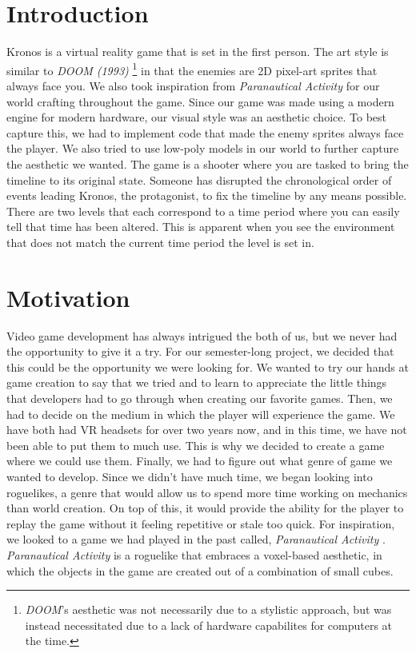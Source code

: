 \documentclass{sigchi}
\begin{document}
\section{Introduction}
Kronos is a virtual reality game that is set in the first person. The art style is similar to \textit{DOOM (1993)} \footnote[1]{\textit{DOOM}'s aesthetic was not necessarily due to a stylistic approach, but was instead necessitated due to a lack of hardware capabilites for computers at the time.} \cite{doom} in that the enemies are 2D pixel-art sprites that always face you. We also took inspiration from \textit{Paranautical Activity} \cite{paranautical} for our world crafting throughout the game. Since our game was made using a modern engine for modern hardware, our visual style was an aesthetic choice. To best capture this, we had to implement code that made the enemy sprites always face the player. We also tried to use low-poly models in our world to further capture the aesthetic we wanted. The game is a shooter where you are tasked to bring the timeline to its original state. Someone has disrupted the chronological order of events leading Kronos, the protagonist, to fix the timeline by any means possible. There are two levels that each correspond to a time period where you can easily tell that time has been altered. This is apparent when you see the environment that does not match the current time period the level is set in. 

\section{Motivation}
Video game development has always intrigued the both of us, but we never had the opportunity to give it a try. For our semester-long project, we decided that this could be the opportunity we were looking for. We wanted to try our hands at game creation to say that we tried and to learn to appreciate the little things that developers had to go through when creating our favorite games. Then, we had to decide on the medium in which the player will experience the game. We have both had VR headsets for over two years now, and in this time, we have not been able to put them to much use. This is why we decided to create a game where we could use them. Finally, we had to figure out what genre of game we wanted to develop. Since we didn’t have much time, we began looking into roguelikes, a genre that would allow us to spend more time working on mechanics than world creation. On top of this, it would provide the ability for the player to replay the game without it feeling repetitive or stale too quick. For inspiration, we looked to a game we had played in the past called, \textit{Paranautical Activity} \cite{paranautical}. \textit{Paranautical Activity} \cite{paranautical} is a roguelike that embraces a voxel-based aesthetic, in which the objects in the game are created out of a combination of small cubes. 
\end{document}
